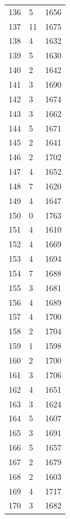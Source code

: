 \documentclass[twocolumn, 11pt]{article} %
\begin{document}
\begin{longtable}{lll}
136       & 5        & 1656     \\
137       & 11       & 1675     \\
138       & 4        & 1632     \\
139       & 5        & 1630     \\
140       & 2        & 1642     \\
141       & 3        & 1690     \\
142       & 3        & 1674     \\
143       & 3        & 1662     \\
144       & 5        & 1671     \\
145       & 2        & 1641     \\
146       & 2        & 1702     \\
147       & 4        & 1652     \\
148       & 7        & 1620     \\
149       & 4        & 1647     \\
150       & 0        & 1763     \\
151       & 4        & 1610     \\
152       & 4        & 1669     \\
153       & 4        & 1694     \\
154       & 7        & 1688     \\
155       & 3        & 1681     \\
156       & 4        & 1689     \\
157       & 4        & 1700     \\
158       & 2        & 1704     \\
159       & 1        & 1598     \\
160       & 2        & 1700     \\
161       & 3        & 1706     \\
162       & 4        & 1651     \\
163       & 3        & 1624     \\
164       & 5        & 1607     \\
165       & 3        & 1691     \\
166       & 5        & 1657     \\
167       & 2        & 1679     \\
168       & 2        & 1603     \\
169       & 4        & 1717     \\
170       & 3        & 1682     \\

\end{longtable}
\end{document}
